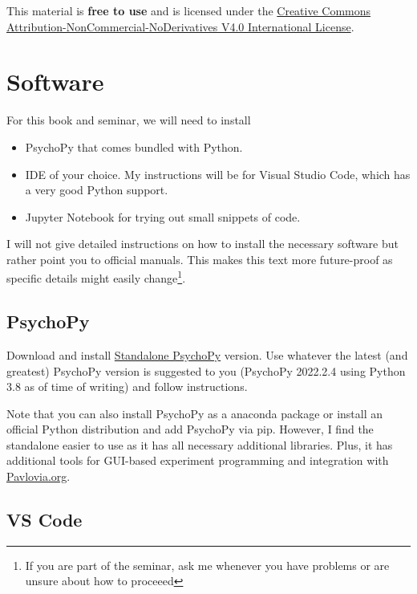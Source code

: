 \documentclass[
]{book}
\providecommand{\tightlist}{%
  \setlength{\itemsep}{0pt}\setlength{\parskip}{0pt}}
\begin{document}
This material is \textbf{free to use} and is licensed under the \href{https://creativecommons.org/licenses/by-nc-nd/4.0/}{Creative Commons Attribution-NonCommercial-NoDerivatives V4.0 International License}.

\hypertarget{software}{%
\chapter{Software}\label{software}}

For this book and seminar, we will need to install

\begin{itemize}
\tightlist
\item
  PsychoPy that comes bundled with Python.
\item
  IDE of your choice. My instructions will be for Visual Studio Code, which has a very good Python support.
\item
  Jupyter Notebook for trying out small snippets of code.
\end{itemize}

I will not give detailed instructions on how to install the necessary software but rather point you to official manuals. This makes this text more future-proof as specific details might easily change\footnote{If you are part of the seminar, ask me whenever you have problems or are unsure about how to proceeed}.

\hypertarget{install-psychopy}{%
\section{PsychoPy}\label{install-psychopy}}

Download and install \href{https://www.psychopy.org/download.html}{Standalone PsychoPy} version. Use whatever the latest (and greatest) PsychoPy version is suggested to you (PsychoPy 2022.2.4 using Python 3.8 as of time of writing) and follow instructions.

Note that you can also install PsychoPy as a anaconda package or install an official Python distribution and add PsychoPy via pip. However, I find the standalone easier to use as it has all necessary additional libraries. Plus, it has additional tools for GUI-based experiment programming and integration with \href{https://pavlovia.org/}{Pavlovia.org}.

\hypertarget{install-vs-code}{%
\section{VS Code}\label{install-vs-code}}
\end{document}
